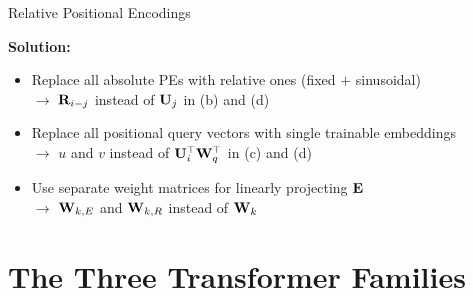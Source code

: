 \begin{vbframe}{Relative Positional Encodings}

\vfill

\textbf{Solution:}

\begin{itemize}
	\item Replace all absolute PEs with relative ones (fixed $+$ sinusoidal)\\
				$\to$ ${\mathbf{R}}_{i-j}$ instead of ${\mathbf{U}}_{j}$ in (b) and (d)
	\item Replace all positional query vectors with single trainable embeddings\\
				$\to$ $u$ and $v$ instead of ${\mathbf{U}}_{i}^\top {\mathbf{W}}_q^\top$ in (c) and (d)
	\item Use separate weight matrices for linearly projecting ${\mathbf{E}}$\\
				$\to$ ${\mathbf{W}}_{k,E}$ and ${\mathbf{W}}_{k,R}$ instead of ${\mathbf{W}}_{k}$
\end{itemize}

\vfill

\end{vbframe}


\section{The Three Transformer Families}

